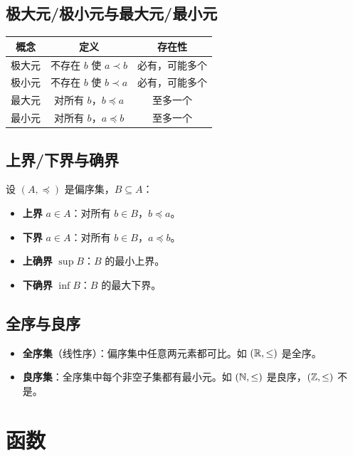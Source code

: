 \subsection{极大元/极小元与最大元/最小元}

\begin{center}
\begin{tabular}{c|c|c}
\toprule
概念 & 定义 & 存在性 \\
\midrule
极大元 & 不存在 $b$ 使 $a \prec b$ & 必有，可能多个 \\
极小元 & 不存在 $b$ 使 $b \prec a$ & 必有，可能多个 \\
最大元 & 对所有 $b$，$b \preceq a$ & 至多一个 \\
最小元 & 对所有 $b$，$a \preceq b$ & 至多一个 \\
\bottomrule
\end{tabular}
\end{center}

\subsection{上界/下界与确界}

设 $(A,\preceq)$ 是偏序集，$B \subseteq A$：
\begin{itemize}
\item \textbf{上界} $a \in A$：对所有 $b \in B$，$b \preceq a$。
\item \textbf{下界} $a \in A$：对所有 $b \in B$，$a \preceq b$。
\item \textbf{上确界} $\sup B$：$B$ 的最小上界。
\item \textbf{下确界} $\inf B$：$B$ 的最大下界。
\end{itemize}

\subsection{全序与良序}

\begin{itemize}
\item \textbf{全序集}（线性序）：偏序集中任意两元素都可比。如 $(\mathbb{R},\leq)$ 是全序。
\item \textbf{良序集}：全序集中每个非空子集都有最小元。如 $(\mathbb{N},\leq)$ 是良序，$(\mathbb{Z},\leq)$ 不是。
\end{itemize}

\section{函数}

